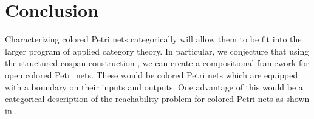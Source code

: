\section{Conclusion}

Characterizing colored Petri nets categorically will allow them to be fit into the larger program of applied category theory. In particular, we conjecture that using the structured cospan construction \cite{StructuredCospans}, we can create a compositional framework for open colored Petri nets. These would be colored Petri nets which are equipped with a boundary on their inputs and outputs. One advantage of this would be a categorical description of the reachability problem for colored Petri nets as shown in \cite{OpenPetriNets}.